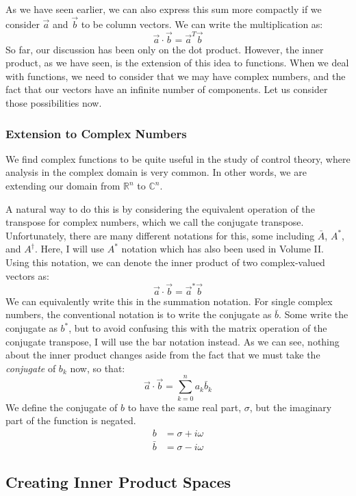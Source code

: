 As we have seen earlier, we can also express this sum more compactly if we consider $\vec{a}$ and $\vec{b}$ to be column vectors. We can write the multiplication as:
$$\vec{a}\cdot \vec{b}=\vec{a}^T\vec{b}$$
So far, our discussion has been only on the dot product. However, the inner product, as we have seen, is the extension of this idea to functions. When we deal with functions, we need to consider that we may have complex numbers, and the fact that our vectors have an infinite number of components. Let us consider those possibilities now.

\subsubsection{Extension to Complex Numbers}
We find complex functions to be quite useful in the study of control theory, where analysis in the complex domain is very common. In other words, we are extending our domain from $\mathbb{R}^n$ to $\mathbb{C}^n$.

A natural way to do this is by considering the equivalent operation of the transpose for complex numbers, which we call the conjugate transpose. Unfortunately, there are many different notations for this, some including $\bar{A}$, $A^*$, and $A^{\dagger}$. Here, I will use $A^*$ notation which has also been used in Volume II. Using this notation, we can denote the inner product of two complex-valued vectors as:
$$\vec{a}\cdot\vec{b}=\vec{a}^*\vec{b}$$
We can equivalently write this in the summation notation. For single complex numbers, the conventional notation is to write the conjugate as $\bar{b}$. Some write the conjugate as $b^*$, but to avoid confusing this with the matrix operation of the conjugate transpose, I will use the bar notation instead. As we can see, nothing about the inner product changes aside from the fact that we must take the \textit{conjugate} of $b_k$ now, so that:
$$\vec{a}\cdot \vec{b}=\sum_{k=0}^{n}{a_k\bar{b}_k}$$
We define the conjugate of $b$ to have the same real part, $\sigma$, but the imaginary part of the function is negated.
\begin{equation}
    \begin{split}
        b&=\sigma+i\omega\\
        \bar{b}&=\sigma-i\omega
    \end{split}
\end{equation}

\subsection{Creating Inner Product Spaces}

